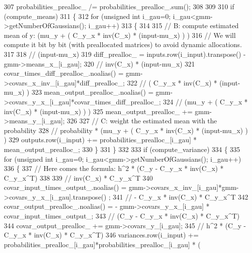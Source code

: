 \begin{DoxyCode}
307     probabilities\_prealloc\_ /= probabilities\_prealloc\_.sum();
308     
309 
310     \textcolor{keywordflow}{if} (compute\_means)
311     \{
312       \textcolor{keywordflow}{for} (\textcolor{keywordtype}{unsigned} \textcolor{keywordtype}{int} i\_gau=0; i\_gau<gmm->getNumberOfGaussians(); i\_gau++)
313       \{
314         
315         \textcolor{comment}{// B: compute estimated mean of y: (mu\_y + ( C\_y\_x * inv(C\_x) * (input-mu\_x) ) )}
316         \textcolor{comment}{// We will compute it bit by bit (with preallocated matrices) to avoid dynamic allocations.}
317         
318         \textcolor{comment}{// (input-mu\_x)}
319         diff\_prealloc\_ = inputs.row(i\_input).transpose() - gmm->means\_x\_[i\_gau];
320         \textcolor{comment}{// inv(C\_x) * (input-mu\_x)}
321         covar\_times\_diff\_prealloc\_.noalias() = gmm->covars\_x\_inv\_[i\_gau]*diff\_prealloc\_;
322         \textcolor{comment}{// ( C\_y\_x * inv(C\_x) * (input-mu\_x) )}
323         mean\_output\_prealloc\_.noalias() = gmm->covars\_y\_x\_[i\_gau]*covar\_times\_diff\_prealloc\_;
324         \textcolor{comment}{// (mu\_y + ( C\_y\_x * inv(C\_x) * (input-mu\_x) ) )}
325         mean\_output\_prealloc\_ += gmm->means\_y\_[i\_gau];
326         
327         \textcolor{comment}{// C: weight the estimated mean with the probability}
328         \textcolor{comment}{// probability * (mu\_y + ( C\_y\_x * inv(C\_x) * (input-mu\_x) ) )}
329         outputs.row(i\_input) += probabilities\_prealloc\_[i\_gau] * mean\_output\_prealloc\_; 
330       \}
331     \}
332    
333     \textcolor{keywordflow}{if} (compute\_variance)
334     \{
335       \textcolor{keywordflow}{for} (\textcolor{keywordtype}{unsigned} \textcolor{keywordtype}{int} i\_gau=0; i\_gau<gmm->getNumberOfGaussians(); i\_gau++)
336       \{
337         \textcolor{comment}{// Here comes the formula: h^2 * (C\_y - C\_y\_x * inv(C\_x) * C\_y\_x^T) }
338         
339         \textcolor{comment}{// inv(C\_x) * C\_y\_x^T}
340         covar\_input\_times\_output\_.noalias() = gmm->covars\_x\_inv\_[i\_gau]*gmm->covars\_y\_x\_[i\_gau].transpose()
      ;
341         \textcolor{comment}{// - C\_y\_x * inv(C\_x) * C\_y\_x^T}
342         covar\_output\_prealloc\_.noalias() = - gmm->covars\_y\_x\_[i\_gau] * covar\_input\_times\_output\_;
343         \textcolor{comment}{// (C\_y - C\_y\_x * inv(C\_x) * C\_y\_x^T) }
344         covar\_output\_prealloc\_ += gmm->covars\_y\_[i\_gau];
345         \textcolor{comment}{// h^2 * (C\_y - C\_y\_x * inv(C\_x) * C\_y\_x^T) }
346         variances.row(i\_input) += probabilities\_prealloc\_[i\_gau]*probabilities\_prealloc\_[i\_gau] * ( 

\end{DoxyCode}
